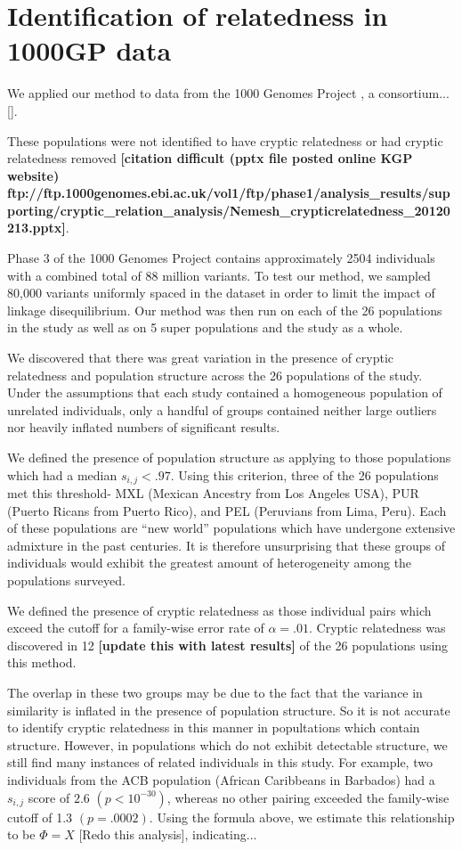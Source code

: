 \documentclass[english]{article}
\begin{document}
\section*{Identification of relatedness in 1000GP data}

We applied our method to data from the 1000 Genomes Project \cite{10002015global, 10002012integrated},
a consortium...{[}{]}.

These populations were not identified to have cryptic relatedness
or had cryptic relatedness removed \textbf{{[}citation difficult (pptx
file posted online KGP website) ftp://ftp.1000genomes.ebi.ac.uk/vol1/ftp/phase1/analysis\_results/supporting/cryptic\_relation\_analysis/Nemesh\_crypticrelatedness\_20120213.pptx{]}}.

Phase 3 of the 1000 Genomes Project contains approximately 2504 individuals
with a combined total of 88 million variants. To test our method,
we sampled 80,000 variants uniformly spaced in the dataset in order
to limit the impact of linkage disequilibrium. Our method was then
run on each of the 26 populations in the study as well as on 5 super
populations and the study as a whole.

We discovered that there was great variation in the presence of cryptic
relatedness and population structure across the 26 populations of
the study. Under the assumptions that each study contained a homogeneous
population of unrelated individuals, only a handful of groups contained
neither large outliers nor heavily inflated numbers of significant
results.

We defined the presence of population structure as applying to those
populations which had a median $s_{i,j}<.97$. Using this criterion,
three of the 26 populations met this threshold- MXL (Mexican Ancestry
from Los Angeles USA), PUR (Puerto Ricans from Puerto Rico), and PEL
(Peruvians from Lima, Peru). Each of these populations are ``new
world'' populations which have undergone extensive admixture in the
past centuries. It is therefore unsurprising that these groups of
individuals would exhibit the greatest amount of heterogeneity among
the populations surveyed.

We defined the presence of cryptic relatedness as those individual
pairs which exceed the cutoff for a family-wise error rate of $\alpha=.01$.
Cryptic relatedness was discovered in 12 \textbf{{[}update this with
latest results{]}} of the 26 populations using this method. 

The overlap in these two groups may be due to the fact that the variance
in similarity is inflated in the presence of population structure.
So it is not accurate to identify cryptic relatedness in this manner
in popultations which contain structure. However, in populations which
do not exhibit detectable structure, we still find many instances
of related individuals in this study. For example, two individuals
from the ACB population (African Caribbeans in Barbados) had a $s_{i,j}$
score of $2.6$ $\left(p<10^{-30}\right)$, whereas no other pairing
exceeded the family-wise cutoff of 1.3 $\left(p=.0002\right)$. Using
the formula above, we estimate this relationship to be $\Phi=X$ {[}Redo
this analysis{]}, indicating...
\end{document}
